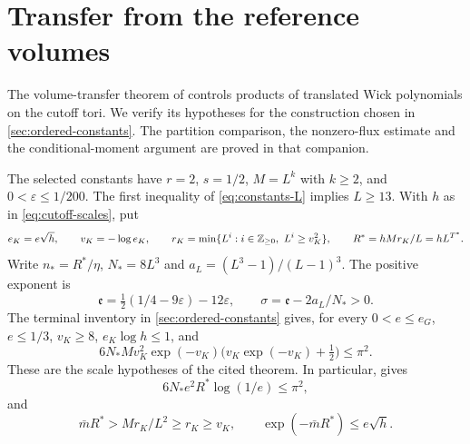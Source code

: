 \section{Transfer from the reference volumes}\label{sec:uniform-transfer}

The volume-transfer theorem of \cite[Theorem~A]{VolumeTransfer}
controls products of translated Wick polynomials on the cutoff
tori. We verify its hypotheses for the construction chosen in
\cref{sec:ordered-constants}. The partition comparison, the
nonzero-flux estimate and the conditional-moment argument are
proved in that companion.

The selected constants have $r=2$, $s=1/2$, $M=L^k$ with
$k\ge2$, and $0<\varepsilon\le1/200$. The first inequality
of \eqref{eq:constants-L} implies $L\ge13$.
With $h$ as in \eqref{eq:cutoff-scales}, put
\begin{equation}\label{eq:transfer-scale-choice}
 e_K=e\sqrt h,\qquad v_K=-\log e_K,\qquad
 r_K=\min\{L^i:i\in\mathbb Z_{\ge0},\ L^i\ge v_K^2\},
 \qquad R^*=hMr_K/L=hL^{T^*}.
\end{equation}
Write $n_*=R^*/\eta$, $N_*=8L^3$ and
$a_L=(L^3-1)/(L-1)^3$. The positive exponent is
\begin{equation}\label{eq:transfer-charge-exponents}
 \mathfrak e=\tfrac12(1/4-9\varepsilon)-12\varepsilon,
 \qquad \sigma=\mathfrak e-2a_L/N_*>0.
\end{equation}
The terminal inventory in \cref{sec:ordered-constants} gives,
for every $0<e\le e_G$, $e\le1/3$, $v_K\ge8$,
$e_K\log h\le1$, and
\begin{equation}\label{eq:transfer-tail-condition}
 6N_*Mv_K^2\exp(-v_K)
             \bigl(v_K\exp(-v_K)+\tfrac12\bigr)\le\pi^2.
\end{equation}
These are the scale hypotheses of the cited theorem. In particular,
\cite[(41), (49)--(51)]{VolumeTransfer} gives
\begin{equation}\label{eq:transfer-W3}
 6N_*e^2R^*\log(1/e)\le\pi^2,
\end{equation}
and
\begin{equation}\label{eq:transfer-volume-error}
 \bar mR^*>Mr_K/L^2\ge r_K\ge v_K,
 \qquad \exp(-\bar mR^*)\le e\sqrt h.
\end{equation}

